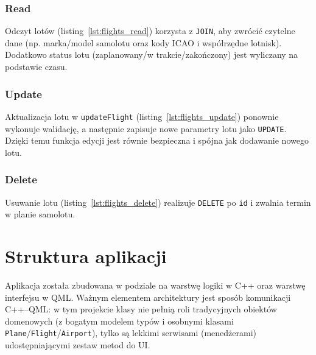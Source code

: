 \documentclass[fleqn,onecolumn,a4paper,12pt,titlepage]{article}
\begin{document}
\subsubsection{Read}

Odczyt lotów (listing~\ref{lst:flights_read}) korzysta z \texttt{JOIN}, aby zwrócić czytelne dane (np. marka/model samolotu oraz kody ICAO i współrzędne lotnisk). Dodatkowo status lotu (zaplanowany/w trakcie/zakończony) jest wyliczany na podstawie czasu.



\subsubsection{Update}

Aktualizacja lotu w \texttt{updateFlight} (listing~\ref{lst:flights_update}) ponownie wykonuje walidację, a następnie zapisuje nowe parametry lotu jako \texttt{UPDATE}. Dzięki temu funkcja edycji jest równie bezpieczna i spójna jak dodawanie nowego lotu.



\subsubsection{Delete}

Usuwanie lotu (listing~\ref{lst:flights_delete}) realizuje \texttt{DELETE} po \texttt{id} i zwalnia termin w planie samolotu.




\newpage

\section{Struktura aplikacji}

Aplikacja została zbudowana w podziale na warstwę logiki w C++ oraz warstwę interfejsu w QML. Ważnym elementem architektury jest sposób komunikacji C++--QML: w tym projekcie klasy nie pełnią roli tradycyjnych obiektów domenowych (z bogatym modelem typów i osobnymi klasami \texttt{Plane}/\texttt{Flight}/\texttt{Airport}), tylko są lekkimi serwisami (menedżerami) udostępniającymi zestaw metod do UI.
\end{document}
